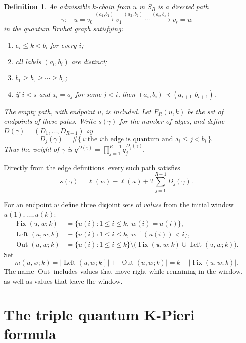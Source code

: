 \documentclass[11pt]{article}
\newtheorem{definition}[proposition]{Definition}
\newcommand{\Fix}{\operatorname{Fix}}
\newcommand{\Left}{\operatorname{Left}}
\newcommand{\Out}{\operatorname{Out}}
\newcommand{\ellength}{\ell}
\begin{document}
\begin{definition}\label{def:chain}
An admissible $k$-chain from $u$ in $S_R$ is a directed path
\[
 \gamma:\quad
 u=v_0\xrightarrow{(a_1,b_1)}v_1
       \xrightarrow{(a_2,b_2)}\cdots
       \xrightarrow{(a_s,b_s)}v_s=w
\]
in the quantum Bruhat graph satisfying:
\begin{enumerate}
 \item $a_i\leq k<b_i$ for every $i$;
 \item all labels $(a_i,b_i)$ are distinct;
 \item $b_1\geq b_2\geq\cdots\geq b_s$;
 \item if $i<s$ and $a_i=a_j$ for some $j<i$, then
       $(a_i,b_i)\prec(a_{i+1},b_{i+1})$.
\end{enumerate}
The empty path, with endpoint $u$, is included.
Let $E_R(u,k)$ be the set of endpoints of these paths.
Write $s(\gamma)$ for the number of edges, and define
$D(\gamma)=(D_1,\ldots,D_{R-1})$ by
\[
 D_j(\gamma)
 =\#\{\,i:\text{the $i$th edge is quantum and }a_i\leq j<b_i\,\}.
\]
Thus the weight of $\gamma$ is
$q^{D(\gamma)}=\prod_{j=1}^{R-1}q_j^{D_j(\gamma)}$.
\end{definition}

 Directly from the edge definitions, every such path satisfies
 \begin{equation}\label{eq:length-degree}
  s(\gamma)=\ellength(w)-\ellength(u)
                +2\sum_{j=1}^{R-1}D_j(\gamma).
 \end{equation}

 For an endpoint $w$ define three disjoint sets of \emph{values}
 from the initial window $u(1),\ldots,u(k)$:
\begin{align*}
 \Fix(u,w;k)
   &=\{u(i):1\leq i\leq k,\ w(i)=u(i)\},\\
 \Left(u,w;k)
   &=\{u(i):1\leq i\leq k,\
                      w^{-1}(u(i))<i\},\\
 \Out(u,w;k)
   &=\{u(i):1\leq i\leq k\}
                        \setminus\bigl(\Fix(u,w;k)\cup\Left(u,w;k)\bigr).
\end{align*}
Set
\[
 m(u,w;k)=|\Left(u,w;k)|+|\Out(u,w;k)|
          =k-|\Fix(u,w;k)|.
\]
The name $\Out$ includes values that move right while remaining in
the window, as well as values that leave the window.

 \section{The triple quantum K-Pieri formula}
\end{document}
